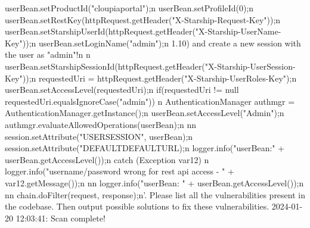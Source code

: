 userBean.setProductId("cloupiaportal");\markdownRendererBackslash{}n userBean.setProfileId(0);\markdownRendererBackslash{}n userBean.setRestKey(httpRequest.getHeader("X-Starship-Request-Key"));\markdownRendererBackslash{}n userBean.setStarshipUserId(httpRequest.getHeader("X-Starship-UserName-Key"));\markdownRendererBackslash{}n userBean.setLoginName("admin");\markdownRendererBackslash{}n \markdownRendererCircumflex{}\markdownRendererCircumflex{}\markdownRendererCircumflex{} 1.10) and create a new session with the user as "admin"!\markdownRendererBackslash{}n \markdownRendererBackslash{}n userBean.setStarshipSessionId(httpRequest.getHeader("X-Starship-UserSession-Key"));\markdownRendererBackslash{}n requestedUri = httpRequest.getHeader("X-Starship-UserRoles-Key");\markdownRendererBackslash{}n userBean.setAccessLevel(requestedUri);\markdownRendererBackslash{}n if(requestedUri != null \markdownRendererAmpersand{}\markdownRendererAmpersand{} requestedUri.equalsIgnoreCase("admin")) \markdownRendererLeftBrace{}\markdownRendererBackslash{}n AuthenticationManager authmgr = AuthenticationManager.getInstance();\markdownRendererBackslash{}n userBean.setAccessLevel("Admin");\markdownRendererBackslash{}n authmgr.evaluateAllowedOperations(userBean);\markdownRendererBackslash{}n \markdownRendererRightBrace{}\markdownRendererBackslash{}n\markdownRendererBackslash{}n session.setAttribute("USERSESSION", userBean);\markdownRendererBackslash{}n session.setAttribute("DEFAULTDEFAULT\markdownRendererUnderscore{}URL);\markdownRendererBackslash{}n logger.info("userBean:" + userBean.getAccessLevel());\markdownRendererBackslash{}n \markdownRendererRightBrace{} catch (Exception var12) \markdownRendererLeftBrace{}\markdownRendererBackslash{}n logger.info("username/password wrong for rest api access - " + var12.getMessage());\markdownRendererBackslash{}n \markdownRendererRightBrace{}\markdownRendererBackslash{}n\markdownRendererBackslash{}n logger.info("userBean: " + userBean.getAccessLevel());\markdownRendererBackslash{}n \markdownRendererRightBrace{}\markdownRendererBackslash{}n\markdownRendererBackslash{}n chain.doFilter(request, response);\markdownRendererBackslash{}n'\markdownRendererRightBrace{}. Please list all the vulnerabilities present in the codebase. Then output possible solutions to fix these vulnerabilities. 2024-01-20 12:03:41: Scan complete!\markdownRendererDocumentEnd